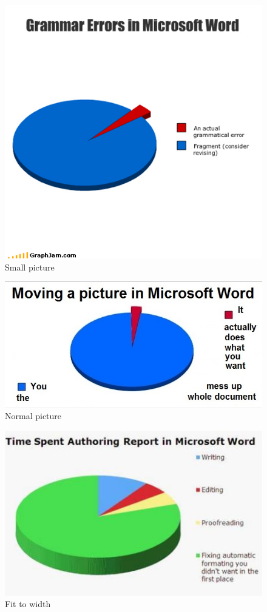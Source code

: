 \begin{figure}[h]
\centering
\includegraphics[scale=0.1]{pic/01.png}
\caption{Small picture}
\end{figure}

\begin{figure}[h]
\centering
\includegraphics[scale=0.5]{pic/02.jpg}
\caption{Normal picture}
\end{figure}

\begin{figure}[h]
\centering
\includegraphics[width=\textwidth]{pic/03.jpg}
\caption{Fit to width}
\end{figure}

